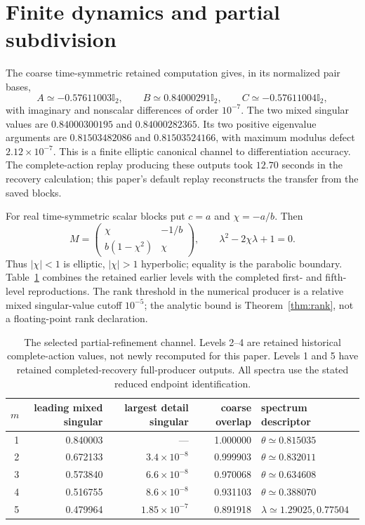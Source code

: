 \documentclass[11pt]{article}
\theoremstyle{remark}\newtheorem{remark}[theorem]{Remark}
\newcommand{\Id}{\mathbb I}
\begin{document}
\section{Finite dynamics and partial subdivision}
\label{sec:numerics}
The coarse time-symmetric retained computation gives, in its normalized pair bases,
\begin{equation}
A\simeq-0.57611003\Id_2,\qquad
B\simeq0.84000291\Id_2,\qquad
C\simeq-0.57611004\Id_2,
\label{eq:blocks}
\end{equation}
with imaginary and nonscalar differences of order $10^{-7}$.
The two mixed singular values are $0.84000300195$ and $0.84000282365$.
Its two positive eigenvalue arguments are $0.81503482086$ and $0.81503524166$, with maximum modulus defect $2.12\times10^{-7}$.
This is a finite elliptic canonical channel to differentiation accuracy.
The complete-action replay producing these outputs took $12.70$ seconds in the recovery calculation; this paper's default replay reconstructs the transfer from the saved blocks.

For real time-symmetric scalar blocks put $c=a$ and $\chi=-a/b$.
Then
\begin{equation}
M=\begin{pmatrix}\chi&-1/b\\b(1-\chi^2)&\chi\end{pmatrix},
\qquad\lambda^2-2\chi\lambda+1=0.
\label{eq:chi}
\end{equation}
Thus $|\chi|<1$ is elliptic, $|\chi|>1$ hyperbolic; equality is the parabolic boundary.
Table~\ref{tab:flow} combines the retained earlier levels with the completed first- and fifth-level reproductions.
The rank threshold in the numerical producer is a relative mixed singular-value cutoff $10^{-5}$; the analytic bound is Theorem~\ref{thm:rank}, not a floating-point rank declaration.

\begin{table}[htbp]
\centering\small
\caption{The selected partial-refinement channel. Levels 2--4 are retained historical complete-action values, not newly recomputed for this paper. Levels 1 and 5 have retained completed-recovery full-producer outputs. All spectra use the stated reduced endpoint identification.}
\label{tab:flow}
\begin{tabular}{rrrrl}
\toprule
$m$&leading mixed singular&largest detail singular&coarse overlap&spectrum descriptor\\
\midrule
1&0.840003&---&1.000000&$\theta\simeq0.815035$\\
2&0.672133&$3.4\times10^{-8}$&0.999903&$\theta\simeq0.832011$\\
3&0.573840&$6.6\times10^{-8}$&0.970068&$\theta\simeq0.634608$\\
4&0.516755&$8.6\times10^{-8}$&0.931103&$\theta\simeq0.388070$\\
5&0.479964&$1.85\times10^{-7}$&0.891918&$\lambda\simeq1.29025,0.77504$\\
\bottomrule
\end{tabular}
\end{table}
\end{document}
